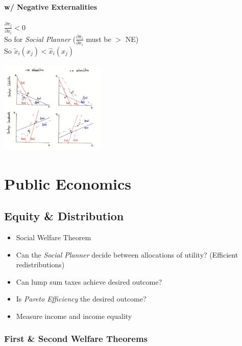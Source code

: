 \documentclass[11pt, english]{article}
\begin{document}
		\paragraph{w/ Negative Externalities}
	
	$\frac{\partial \pi_j}{\partial x_i}<0$\\           
        So for \textit{Social Planner} ($\frac{\partial \pi_i}{\partial x_i}$ must be $>$ NE)\\
        So ${\widetilde{x}}_i\left(x_j\right)<{\hat{x}}_i\left(x_j\right)$

	\begin{center}
		\includegraphics[width=5cm,height=4.5cm]{EC315-IMG/21.png}
	\end{center}

\newpage

\section{Public Economics}

	\subsection{Equity \& Distribution}

	\begin{itemize}
	\setlength\itemsep{0cm}
		\item Social Welfare Theorem
		\item Can the \textit{Social Planner} decide between allocations of utility? (Efficient redistributions)
		\item Can lump sum taxes achieve desired outcome?
		\item Is \textit{Pareto Efficiency} the desired outcome?
		\item Measure income and income equality
	\end{itemize}
		
		\subsubsection{First \& Second Welfare Theorems}
\end{document}

